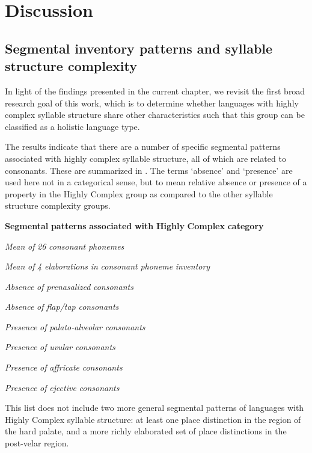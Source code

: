 \section{Discussion}\label{sec:4.5}
\subsection{Segmental inventory patterns and syllable structure complexity}\label{sec:4.5.1}

  In light of the findings presented in the current chapter, we revisit the first broad research goal of this work, which is to determine whether languages with highly complex syllable structure share other characteristics such that this group can be classified as a holistic language type.

  The results indicate that there are a number of specific segmental patterns associated with highly complex syllable structure, all of which are related to consonants. These are summarized in . The terms ‘absence’ and ‘presence’ are used here not in a categorical sense, but to mean relative absence or presence of a property in the Highly Complex group as compared to the other syllable structure complexity groups.

\ea\label{ex:(4.34)}
  \textbf{Segmental} \textbf{patterns} \textbf{associated} \textbf{with} \textbf{Highly} \textbf{Complex} \textbf{category}

\textit{Mean} \textit{of} \textit{26} \textit{consonant} \textit{phonemes}

\textit{Mean} \textit{of} \textit{4} \textit{elaborations} \textit{in} \textit{consonant} \textit{phoneme} \textit{inventory}

\textit{Absence} \textit{of} \textit{prenasalized} \textit{consonants}

\textit{Absence} \textit{of} \textit{flap/tap} \textit{consonants}

\textit{Presence} \textit{of} \textit{palato-alveolar} \textit{consonants}

\textit{Presence} \textit{of} \textit{uvular} \textit{consonants}

\textit{Presence} \textit{of} \textit{affricate} \textit{consonants} 

\textit{Presence} \textit{of} \textit{ejective} \textit{consonants}

\z

  This list does not include two more general segmental patterns of languages with Highly Complex syllable structure: at least one place distinction in the region of the hard palate, and a more richly elaborated set of place distinctions in the post-velar region.

